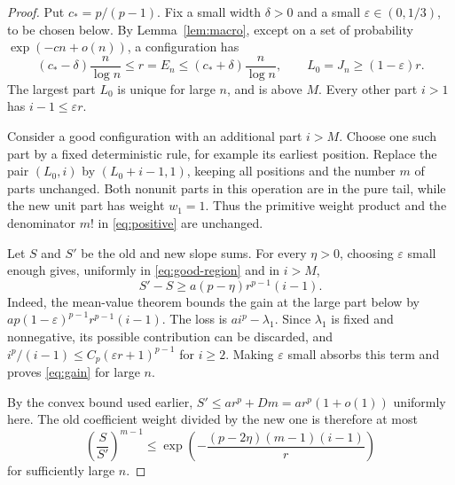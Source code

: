 \documentclass[11pt,a4paper]{article}
\numberwithin{equation}{section}
\theoremstyle{definition}
\theoremstyle{remark}
\begin{document}
\begin{proof}
Put $c_*=p/(p-1)$. Fix a small width $\delta>0$ and a small
$\varepsilon\in(0,1/3)$, to be chosen below. By
Lemma~\ref{lem:macro}, except on a set of probability
$\exp(-cn+o(n))$, a configuration has
\begin{equation}
 (c_*-\delta)\frac n{\log n}\le r=E_n
 \le(c_*+\delta)\frac n{\log n},
 \qquad L_0=J_n\ge(1-\varepsilon)r.
 \label{eq:good-region}
\end{equation}
The largest part $L_0$ is unique for large $n$, and is above $M$.
Every other part $i>1$ has $i-1\le\varepsilon r$.

Consider a good configuration with an additional part $i>M$. Choose one
such part by a fixed deterministic rule, for example its earliest position.
Replace the pair $(L_0,i)$ by $(L_0+i-1,1)$, keeping all positions and the
number $m$ of parts unchanged. Both nonunit parts in this operation are
in the pure tail, while the new unit part has weight $w_1=1$. Thus the
primitive weight product and the denominator $m!$ in
\eqref{eq:positive} are unchanged.

Let $S$ and $S'$ be the old and new slope sums. For every $\eta>0$,
choosing $\varepsilon$ small enough gives, uniformly in
\eqref{eq:good-region} and in $i>M$,
\begin{equation}
 S'-S\ge a(p-\eta)r^{p-1}(i-1).
 \label{eq:gain}
\end{equation}
Indeed, the mean-value theorem bounds the gain at the large part below by
$ap(1-\varepsilon)^{p-1}r^{p-1}(i-1)$. The loss is
$a i^p-\lambda_1$. Since $\lambda_1$ is fixed and nonnegative, its possible
contribution can be discarded, and
$i^p/(i-1)\le C_p(\varepsilon r+1)^{p-1}$ for $i\ge2$.
Making $\varepsilon$ small absorbs this term and proves
\eqref{eq:gain} for large $n$.

By the convex bound used earlier,
$S'\le a r^p+Dm=a r^p(1+o(1))$ uniformly here. The old coefficient
weight divided by the new one is therefore at most
\begin{equation}
 \left(\frac S{S'}\right)^{m-1}
 \le\exp\!\left(-\frac{(p-2\eta)(m-1)(i-1)}r\right)
 \label{eq:weight-ratio}
\end{equation}
for sufficiently large $n$.


\end{proof}
\end{document}
